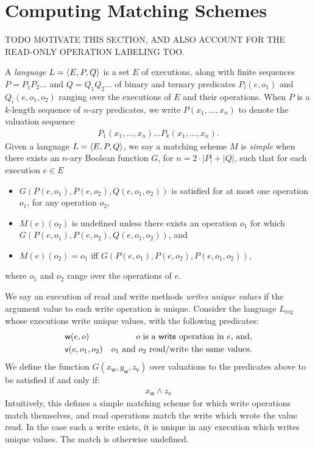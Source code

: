 \section{Computing Matching Schemes}
\label{sec:matching}

TODO MOTIVATE THIS SECTION, AND ALSO ACCOUNT FOR THE READ-ONLY OPERATION
LABELING TOO.

A \emph{language} $L = {\left\langle{E,P,Q}\right\rangle}$ is a set $E$ of executions, along with
finite sequences $P = P_1 P_2 \ldots$ and $Q = Q_1 Q_2 \ldots$ of binary and
ternary predicates $P_i(e,o_1)$ and $Q_i(e,o_1,o_2)$ ranging over the
executions of $E$ and their operations. When $P$ is a $k$-length sequence of
$n$-ary predicates, we write $P(x_1, \ldots, x_n)$ to denote the valuation
sequence
\begin{align*}
  P_1(x_1, \ldots, x_n) \ldots P_k(x_1, \ldots, x_n).
\end{align*}
Given a language $L = {\left\langle{E,P,Q}\right\rangle}$, we say a matching scheme $M$ is
\emph{simple} when there exists an $n$-ary Boolean function $G$, for $n =
2\cdot|P|+|Q|$, such that for each execution $e \in E$
\begin{itemize}

  \item $G(P(e,o_1),P(e,o_2),Q(e,o_1,o_2))$ is satisfied for at most one
  operation $o_1$, for any operation $o_2$,

  \item $M(e)(o_2)$ is undefined unless there exists an operation $o_1$
  for which $G(P(e,o_1),P(e,o_2),Q(e,o_1,o_2))$, and

  \item $M(e)(o_2) = o_1$ if{f} $G(P(e,o_1),P(e,o_2),P(e,o_1,o_2))$,

\end{itemize}
where $o_1$ and $o_2$ range over the operations of $e$.

\begin{example}
  \label{ex:register-language}

  We say an execution of read and write methods \emph{writes unique values} if
  the argument value to each write operation is unique. Consider the language
  $L_\mathrm{reg}$
  whose executions write unique values, with the following predicates:
  \begin{align*}
    & \mathsf{w}(e,o) & \text{$o$ is a {\sf write} operation in $e$, and}, \\
    & \mathsf{v}(e,o_1,o_2) & \text{$o_1$ and $o_2$ read/write the same values.}
  \end{align*}
  We define the function $G(x_\mathsf{w}, y_\mathsf{w}, z_\mathsf{v})$ over
  valuations to the predicates above to be satisfied if and only if:
  \begin{align*}
    x_\mathsf{w} \land z_\mathsf{v}
  \end{align*}
  Intuitively, this defines a simple matching scheme for which write
  operations match themselves, and read operations match the write which wrote
  the value read. In the case such a write exists, it is unique in any
  execution which writes unique values. The match is otherwise undefined.

\end{example}

